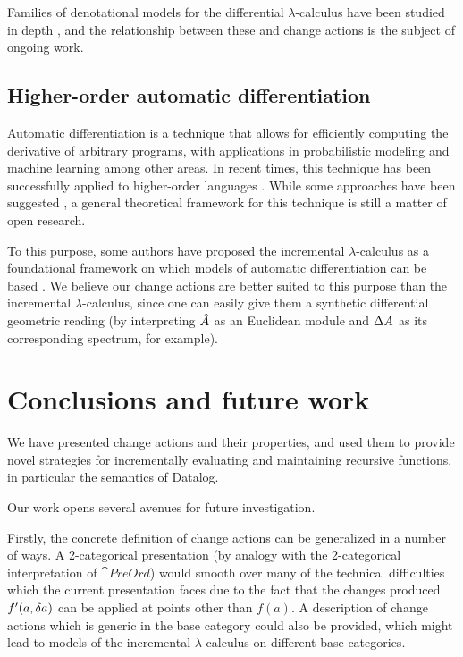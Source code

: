 Families of denotational models for the differential $\lambda$-calculus have been
studied in depth
\autocites{bucciarelli2010categorical}{blute2010convenient}{cockett2016categorical}{kerjean2016mackey},
and the relationship between these and change actions is the subject of ongoing work.

\subsection{Higher-order automatic differentiation}

Automatic differentiation \autocite{griewank2008evaluating} is a technique that allows
for efficiently computing the derivative of arbitrary programs, with
applications in probabilistic modeling \autocite{kucukelbir2017automatic}
and machine learning \autocite{baydin2014automatic} among other areas. In recent times, this technique has been successfully
applied to higher-order languages \autocites{siskind2008nesting}{baydin2016diffsharp}.
While some approaches have been suggested \autocites{manzyuk2012simply}{kelly2016evolving}, a general
theoretical framework for this technique is still a matter of open research. 

To this purpose, some authors have proposed the incremental $\lambda$-calculus
as a foundational framework on which models of automatic differentiation can
be based \autocite{kelly2016evolving}. We believe our change actions are better suited
to this purpose than the incremental $\lambda$-calculus, since one can easily give them a
synthetic differential geometric reading (by interpreting $\hat{A}$ as an Euclidean module and $\Delta A$
as its corresponding spectrum, for example).

\section{Conclusions and future work}

We have presented change actions and their properties, and used them to provide novel
strategies for incrementally evaluating and maintaining recursive functions, in
particular the semantics of Datalog.

Our work opens several avenues for future investigation.

Firstly, the concrete definition of change actions can be generalized in a number of
ways. A 2-categorical presentation (by analogy with the 2-categorical interpretation
of $\cat{PreOrd}$) would smooth over many of the technical difficulties which
the current presentation faces due to the fact that the changes produced
$f'(a, \delta a)$ can be applied at points other than $f(a)$.
A description of change actions which is generic in
the base category could also be provided, which might lead to models of
the incremental $\lambda$-calculus on different base categories. 

